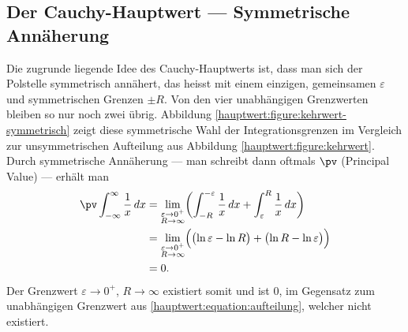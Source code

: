 \subsection{Der Cauchy-Hauptwert --- Symmetrische Annäherung}

Die zugrunde liegende Idee des Cauchy-Hauptwerts ist, dass
man sich der Polstelle symmetrisch annähert, das heisst mit
einem einzigen, gemeinsamen $\varepsilon$ und symmetrischen Grenzen $\pm R$.
Von den vier unabhängigen Grenzwerten bleiben so nur noch zwei übrig.
Abbildung \ref{hauptwert:figure:kehrwert-symmetrisch} zeigt diese symmetrische
Wahl der Integrationsgrenzen im Vergleich zur unsymmetrischen Aufteilung
aus Abbildung \ref{hauptwert:figure:kehrwert}. Durch symmetrische Annäherung
--- man schreibt dann oftmals $\pv$ (Principal Value) --- erhält man
\begin{equation}
\begin{aligned}
\pv\int_{-\infty}^{\infty} \frac{1}{x}\,dx
&= \lim_{\substack{\varepsilon\to 0^+\\ R\to\infty}}
\biggl(
\int_{-R}^{-\varepsilon} \frac{1}{x}\,dx + \int_{\varepsilon}^{R} \frac{1}{x}\,dx
\biggr) \\
&= \lim_{\substack{\varepsilon\to 0^+\\ R\to\infty}}
\Bigl(
\bigl(\ln\varepsilon - \ln R\bigr) + \bigl(\ln R - \ln\varepsilon\bigr)
\Bigr) \\
&= 0.
\end{aligned}
\label{hauptwert:equation:symmetrisch}
\end{equation}
Der Grenzwert $\varepsilon \to 0^+$, $R \to \infty$ existiert somit und ist $0$,
im Gegensatz zum unabhängigen Grenzwert aus
\eqref{hauptwert:equation:aufteilung}, welcher nicht existiert.

